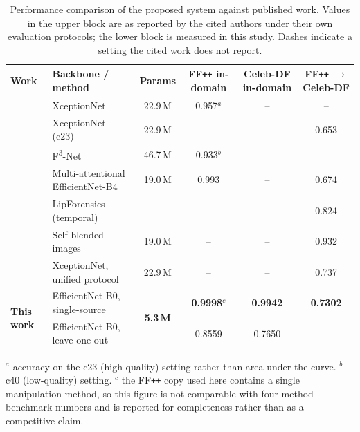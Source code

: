 \documentclass[journal,onecolumn]{IEEEtran}
\newcommand{\celebdf}{Celeb-DF}
\newcommand{\ffpp}{FF\texttt{++}}
\newcommand{\best}[1]{\textbf{#1}}
\begin{document}
\begin{table}[!ht]
\centering
\caption{Performance comparison of the proposed system against published work.
Values in the upper block are as reported by the cited authors under their own
evaluation protocols; the lower block is measured in this study. Dashes indicate
a setting the cited work does not report.}
\label{tab:comparison}
\footnotesize
\setlength{\tabcolsep}{3.5pt}
\begin{tabular}{llcccc}
\toprule
\textbf{Work} & \textbf{Backbone / method} & \textbf{Params} &
\textbf{\ffpp{} in-domain} & \textbf{\celebdf{} in-domain} &
\textbf{\ffpp{} $\rightarrow$ \celebdf{}} \\
\midrule
\cite{rossler2019faceforensics}   & XceptionNet                 & 22.9\,M & 0.957$^{a}$ & --   & --   \\
\cite{li2020celebdf}                   & XceptionNet (c23)           & 22.9\,M & --         & --   & 0.653 \\
\cite{qian2020f3net}                 & F\textsuperscript{3}-Net    & 46.7\,M & 0.933$^{b}$ & --   & --   \\
\cite{zhao2021multiattentional}      & Multi-attentional EfficientNet-B4 & 19.0\,M & 0.993 & -- & 0.674 \\
\cite{haliassos2021lips}        & LipForensics (temporal)     & --     & --         & --   & 0.824 \\
\cite{shiohara2022sbi}               & Self-blended images         & 19.0\,M & --         & --   & 0.932 \\
\cite{yan2023deepfakebench}           & XceptionNet, unified protocol & 22.9\,M & --       & --   & 0.737 \\
\midrule
\multirow{2}{*}{\textbf{This work}}
 & EfficientNet-B0, single-source & \multirow{2}{*}{\textbf{5.3\,M}} & \best{0.9998}$^{c}$ & \best{0.9942} & \best{0.7302} \\
 & EfficientNet-B0, leave-one-out & & 0.8559 & 0.7650 & -- \\
\bottomrule
\end{tabular}

\begin{minipage}{0.95\textwidth}
\footnotesize
$^{a}$ accuracy on the c23 (high-quality) setting rather than area under the
curve. $^{b}$ c40 (low-quality) setting. $^{c}$ the \ffpp{} copy used here
contains a single manipulation method, so this figure is not comparable with
four-method benchmark numbers and is reported for completeness rather than as a
competitive claim.
\end{minipage}
\end{table}
\end{document}
